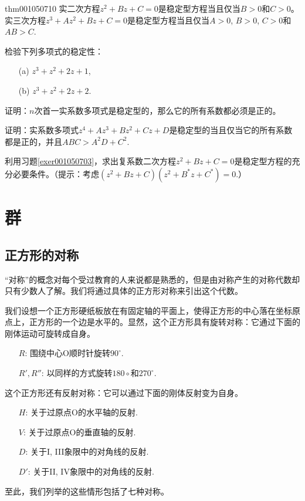 \begin{theorem}{}{thm001050710}
实二次方程$z^2+Bz+C=0$是稳定型方程当且仅当$B>0$和$C>0$。实三次方程$z^3+Az^2+Bz+C=0$是稳定型方程当且仅当$A>0$, $B>0$, $C>0$和$AB>C$.
\end{theorem}

\begin{problemset}
\item 检验下列多项式的稳定性：
\begin{enumerate}
\item[(a)] $z^3+z^2+2z+1$,
\item[(b)] $z^3+z^2+2z+2$.
\end{enumerate}

\item 证明：$n$次首一实系数多项式是稳定型的，那么它的所有系数都必须是正的。

\item\label{exer001050703} 证明：实系数多项式$z^4 + Az^3 + Bz^2 + Cz + D$是稳定型的当且仅当它的所有系数都是正的，并且$ABC > A^2D + C^2$.

\item 利用习题\ref{exer001050703}，求出复系数二次方程$z^2 + Bz + C = 0$是稳定型方程的充分必要条件。（提示：考虑$(z^2+Bz + C)(z^2 + B^*z + C^*) = 0$.）
\end{problemset}


\chapter{群}\label{chapter00106}
\section{正方形的对称}\label{section0010601}
“对称”的概念对每个受过教育的人来说都是熟悉的，但是由对称产生的对称代数却只有少数人了解。我们将通过具体的正方形对称来引出这个代数。

我们设想一个正方形硬纸板放在有固定轴的平面上，使得正方形的中心落在坐标原点上，正方形的一个边是水平的。显然，这个正方形具有旋转对称：它通过下面的刚体运动可旋转成自身。
\begin{enumerate}
\item[$R$:]围绕中心O顺时针旋转$90^{\circ}$.
\item[$R',R''$:]以同样的方式旋转$180{\circ}$和$270^{\circ}$.
\end{enumerate}
这个正方形还有反射对称：它可以通过下面的刚体反射变为自身。
\begin{enumerate}
\item[$H$:]关于过原点O的水平轴的反射.
\item[$V$:]关于过原点O的垂直轴的反射.
\item[$D$:]关于I, III象限中的对角线的反射.
\item[$D'$:]关于II, IV象限中的对角线的反射.
\end{enumerate}
至此，我们列举的这些情形包括了七种对称。


